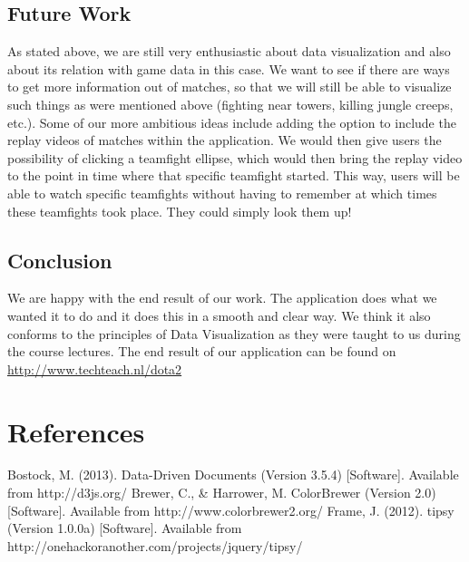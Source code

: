 \documentclass[11pt,twoside,a4paper]{article}
\begin{document}
\subsection{Future Work}
As stated above, we are still very enthusiastic about data visualization and also about its relation with game data in this case. We want to see if there are ways to get more information out of matches, so that we will still be able to visualize such things as were mentioned above (fighting near towers, killing jungle creeps, etc.).\newline
Some of our more ambitious ideas include adding the option to include the replay videos of matches within the application. We would then give users the possibility of clicking a teamfight ellipse, which would then bring the replay video to the point in time where that specific teamfight started. This way, users will be able to watch specific teamfights without having to remember at which times these teamfights took place. They could simply look them up!

\subsection{Conclusion}
We are happy with the end result of our work. The application does what we wanted it to do and it does this in a smooth and clear way. We think it also conforms to the principles of Data Visualization as they were taught to us during the course lectures.
The end result of our application can be found on \url{http://www.techteach.nl/dota2}


\section{References}
Bostock, M. (2013). Data-Driven Documents (Version 3.5.4) [Software]. Available from http://d3js.org/ \label{ref:d3}
\newline
Brewer, C., \& Harrower, M. ColorBrewer (Version 2.0) [Software]. Available from http://www.colorbrewer2.org/ \label{ref:colorbrewer}
\newline
Frame, J. (2012). tipsy (Version 1.0.0a) [Software]. Available from http://onehackoranother.com/projects/jquery/tipsy/ \label{ref:tipsy}
\end{document}
